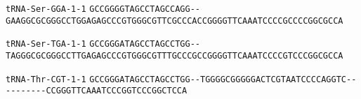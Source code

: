 \documentclass{article}
\newcommand{\rnabox}[1]{\colorbox{#1}{\texttt{#1}}}
\begin{document}
\vspace{-0.5mm}

\texttt{tRNA-Ser-GGA-1-1}
\rnabox{G}\rnabox{C}\rnabox{C}\rnabox{G}\rnabox{G}\rnabox{G}\rnabox{G}\rnabox{T}\rnabox{A}\rnabox{G}\rnabox{C}\rnabox{C}\rnabox{T}\rnabox{A}\rnabox{G}\rnabox{C}\rnabox{C}\rnabox{A}\rnabox{G}\rnabox{G}\rnabox{-}\rnabox{-}\rnabox{G}\rnabox{A}\rnabox{A}\rnabox{G}\rnabox{G}\rnabox{C}\rnabox{G}\rnabox{C}\rnabox{G}\rnabox{G}\rnabox{G}\rnabox{C}\rnabox{C}\rnabox{T}\rnabox{G}\rnabox{G}\rnabox{A}\rnabox{G}\rnabox{A}\rnabox{G}\rnabox{C}\rnabox{C}\rnabox{C}\rnabox{G}\rnabox{T}\rnabox{G}\rnabox{G}\rnabox{G}\rnabox{C}\rnabox{G}\rnabox{T}\rnabox{T}\rnabox{C}\rnabox{G}\rnabox{C}\rnabox{C}\rnabox{C}\rnabox{A}\rnabox{C}\rnabox{C}\rnabox{G}\rnabox{G}\rnabox{G}\rnabox{G}\rnabox{T}\rnabox{T}\rnabox{C}\rnabox{A}\rnabox{A}\rnabox{A}\rnabox{T}\rnabox{C}\rnabox{C}\rnabox{C}\rnabox{C}\rnabox{G}\rnabox{C}\rnabox{C}\rnabox{C}\rnabox{C}\rnabox{G}\rnabox{G}\rnabox{C}\rnabox{G}\rnabox{C}\rnabox{C}\rnabox{A}

\vspace{-0.5mm}

\texttt{tRNA-Ser-TGA-1-1}
\rnabox{G}\rnabox{C}\rnabox{C}\rnabox{G}\rnabox{G}\rnabox{G}\rnabox{A}\rnabox{T}\rnabox{A}\rnabox{G}\rnabox{C}\rnabox{C}\rnabox{T}\rnabox{A}\rnabox{G}\rnabox{C}\rnabox{C}\rnabox{T}\rnabox{G}\rnabox{G}\rnabox{-}\rnabox{-}\rnabox{T}\rnabox{A}\rnabox{G}\rnabox{G}\rnabox{G}\rnabox{C}\rnabox{G}\rnabox{C}\rnabox{G}\rnabox{G}\rnabox{G}\rnabox{C}\rnabox{C}\rnabox{T}\rnabox{T}\rnabox{G}\rnabox{A}\rnabox{G}\rnabox{A}\rnabox{G}\rnabox{C}\rnabox{C}\rnabox{C}\rnabox{G}\rnabox{T}\rnabox{G}\rnabox{G}\rnabox{G}\rnabox{C}\rnabox{G}\rnabox{T}\rnabox{T}\rnabox{T}\rnabox{G}\rnabox{C}\rnabox{C}\rnabox{C}\rnabox{G}\rnabox{C}\rnabox{C}\rnabox{G}\rnabox{G}\rnabox{G}\rnabox{G}\rnabox{T}\rnabox{T}\rnabox{C}\rnabox{A}\rnabox{A}\rnabox{A}\rnabox{T}\rnabox{C}\rnabox{C}\rnabox{C}\rnabox{C}\rnabox{G}\rnabox{T}\rnabox{C}\rnabox{C}\rnabox{C}\rnabox{G}\rnabox{G}\rnabox{C}\rnabox{G}\rnabox{C}\rnabox{C}\rnabox{A}

\vspace{-0.5mm}

\texttt{tRNA-Thr-CGT-1-1}
\rnabox{G}\rnabox{C}\rnabox{C}\rnabox{G}\rnabox{G}\rnabox{G}\rnabox{A}\rnabox{T}\rnabox{A}\rnabox{G}\rnabox{C}\rnabox{C}\rnabox{T}\rnabox{A}\rnabox{G}\rnabox{C}\rnabox{C}\rnabox{T}\rnabox{G}\rnabox{G}\rnabox{-}\rnabox{-}\rnabox{T}\rnabox{G}\rnabox{G}\rnabox{G}\rnabox{G}\rnabox{C}\rnabox{G}\rnabox{G}\rnabox{G}\rnabox{G}\rnabox{G}\rnabox{A}\rnabox{C}\rnabox{T}\rnabox{C}\rnabox{G}\rnabox{T}\rnabox{A}\rnabox{A}\rnabox{T}\rnabox{C}\rnabox{C}\rnabox{C}\rnabox{C}\rnabox{A}\rnabox{G}\rnabox{G}\rnabox{T}\rnabox{C}\rnabox{-}\rnabox{-}\rnabox{-}\rnabox{-}\rnabox{-}\rnabox{-}\rnabox{-}\rnabox{-}\rnabox{-}\rnabox{-}\rnabox{C}\rnabox{C}\rnabox{G}\rnabox{G}\rnabox{G}\rnabox{T}\rnabox{T}\rnabox{C}\rnabox{A}\rnabox{A}\rnabox{A}\rnabox{T}\rnabox{C}\rnabox{C}\rnabox{C}\rnabox{G}\rnabox{G}\rnabox{T}\rnabox{C}\rnabox{C}\rnabox{C}\rnabox{G}\rnabox{G}\rnabox{C}\rnabox{T}\rnabox{C}\rnabox{C}\rnabox{A}
\end{document}
